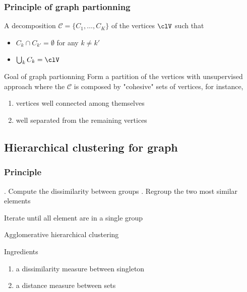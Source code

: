 \documentclass{beamer}\usepackage[]{graphicx}\usepackage[]{color}
\begin{document}
\begin{frame}
  \frametitle{Principle of graph partionning}

  \begin{definition}[Partition]
    A decomposition $\mathcal{C} = \{C_1,\dots,C_K\}$ of the vertices $\clV$ such that
    \begin{itemize}
      \item $C_k \cap C_{k'} = \emptyset$ for any $k\neq k'$
      \item $\bigcup_{k} C_k = \clV$
    \end{itemize}
  \end{definition}

  \vfill

  \begin{block}{Goal of graph partionning}
    Form a partition of the vertices with unsupervised approach where the $\mathcal{C}$ is composed by \alert{"cohesive"} sets of vertices, for instance,
    \begin{enumerate}
      \item vertices well connected among themselves
      \item well separated from the remaining vertices
    \end{enumerate}
    
  \end{block}

\end{frame}


\subsection{Hierarchical clustering for graph}

\begin{frame}
  \frametitle{Principle}


  \begin{algorithm}[H]
    \BlankLine\BlankLine
    . Compute the dissimilarity between groups . Regroup the two most similar elements \;
      
      Iterate until all element are in a single group \;
    \BlankLine\BlankLine

    \caption{Agglomerative hierarchical clustering}
  \end{algorithm}
  
  \begin{block}{Ingredients}
    \begin{enumerate}
      \item a dissimilarity measure between singleton
      \item a distance measure between sets
    \end{enumerate}
  \end{block}

\end{frame}
\end{document}
